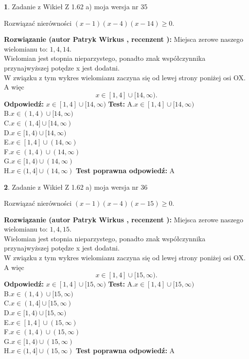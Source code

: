 \documentclass[12pt, a4paper]{article}
\theoremstyle{definition} %
\newtheorem{zad}{}
\newcommand{\zadStart}[1]{\begin{zad}#1\newline}
\newcommand{\zadStop}{\end{zad}}
\newcommand{\rozwStart}[2]{\noindent \textbf{Rozwiązanie (autor #1 , recenzent #2): }\newline}
\newcommand{\rozwStop}{\newline}
\newcommand{\odpStart}{\noindent \textbf{Odpowiedź:}\newline}
\newcommand{\odpStop}{\newline}
\newcommand{\testStart}{\noindent \textbf{Test:}\newline}
\newcommand{\testStop}{\newline}
\newcommand{\kluczStart}{\noindent \textbf{Test poprawna odpowiedź:}\newline}
\newcommand{\kluczStop}{\newline}
\begin{document}
\zadStart{Zadanie z Wikieł Z 1.62 a) moja wersja nr 35}

Rozwiązać nierówności $(x-1)(x-4)(x-14)\ge0$.
\zadStop
\rozwStart{Patryk Wirkus}{}
Miejsca zerowe naszego wielomianu to: $1, 4, 14$.\\
Wielomian jest stopnia nieparzystego, ponadto znak współczynnika przy\linebreak najwyższej potędze x jest dodatni.\\ W związku z tym wykres wielomianu zaczyna się od lewej strony poniżej osi OX. A więc $$x \in [1,4] \cup [14,\infty).$$
\rozwStop
\odpStart
$x \in [1,4] \cup [14,\infty)$
\odpStop
\testStart
A.$x \in [1,4] \cup [14,\infty)$\\
B.$x \in (1,4) \cup [14,\infty)$\\
C.$x \in (1,4] \cup [14,\infty)$\\
D.$x \in [1,4) \cup [14,\infty)$\\
E.$x \in [1,4] \cup (14,\infty)$\\
F.$x \in (1,4) \cup (14,\infty)$\\
G.$x \in [1,4) \cup (14,\infty)$\\
H.$x \in (1,4] \cup (14,\infty)$
\testStop
\kluczStart
A
\kluczStop



\zadStart{Zadanie z Wikieł Z 1.62 a) moja wersja nr 36}

Rozwiązać nierówności $(x-1)(x-4)(x-15)\ge0$.
\zadStop
\rozwStart{Patryk Wirkus}{}
Miejsca zerowe naszego wielomianu to: $1, 4, 15$.\\
Wielomian jest stopnia nieparzystego, ponadto znak współczynnika przy\linebreak najwyższej potędze x jest dodatni.\\ W związku z tym wykres wielomianu zaczyna się od lewej strony poniżej osi OX. A więc $$x \in [1,4] \cup [15,\infty).$$
\rozwStop
\odpStart
$x \in [1,4] \cup [15,\infty)$
\odpStop
\testStart
A.$x \in [1,4] \cup [15,\infty)$\\
B.$x \in (1,4) \cup [15,\infty)$\\
C.$x \in (1,4] \cup [15,\infty)$\\
D.$x \in [1,4) \cup [15,\infty)$\\
E.$x \in [1,4] \cup (15,\infty)$\\
F.$x \in (1,4) \cup (15,\infty)$\\
G.$x \in [1,4) \cup (15,\infty)$\\
H.$x \in (1,4] \cup (15,\infty)$
\testStop
\kluczStart
A
\kluczStop
\end{document}
